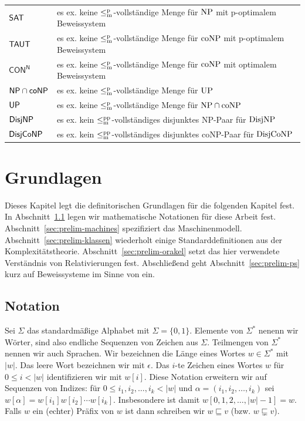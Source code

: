 \bigskip
\begin{tabular}{l@{\quad:\quad}l}
    $\mathsf{SAT}$ & es ex. keine $\leq_\mathrm{m}^\mathrm{p}$-vollständige Menge für $\mathrm{NP}$ mit p-optimalem Beweissystem\\
    $\mathsf{TAUT}$ & es ex. keine $\leq_\mathrm{m}^\mathrm{p}$-vollständige Menge für $\mathrm{coNP}$ mit p-optimalem Beweissystem\\
    $\mathsf{CON^N}$ & es ex. keine $\leq_\mathrm{m}^\mathrm{p}$-vollständige Menge für $\mathrm{coNP}$ mit optimalem Beweissystem\\
    $\mathsf{NP}{}\cap{}\mathsf{coNP}$ & es ex. keine $\leq_\mathrm{m}^\mathrm{p}$-vollständige Menge für $\mathrm{UP}$\\
    $\mathsf{UP}$ & es ex. keine $\leq_\mathrm{m}^\mathrm{p}$-vollständige Menge für $\mathrm{NP}\cap\mathrm{coNP}$\\
    $\mathsf{DisjNP}$ & es ex. kein $\leq_\mathrm{m}^\mathrm{pp}$-vollständiges disjunktes NP-Paar für $\mathrm{DisjNP}$\\
    $\mathsf{DisjCoNP}$ & es ex. kein $\leq_\mathrm{m}^\mathrm{pp}$-vollständiges disjunktes coNP-Paar für $\mathrm{DisjCoNP}$
\end{tabular}
\bigskip

\chapter{Grundlagen}

Dieses Kapitel legt die definitorischen Grundlagen für die folgenden Kapitel fest. In Abschnitt~\ref{sec:notation} legen wir mathematische Notationen für diese Arbeit fest. Abschnitt~\ref{sec:prelim-machines} spezifiziert das Maschinenmodell.  Abschnitt~\ref{sec:prelim-klassen} wiederholt einige Standarddefinitionen aus der Komplexitätstheorie. Abschnitt~\ref{sec:prelim-orakel} setzt das hier verwendete Verständnis von Relativierungen fest. Abschließend geht Abschnitt~\ref{sec:prelim-ps} kurz auf Beweissysteme im Sinne von \textcite{cook_relative_1979} ein.

\section{Notation}\label{sec:notation}

Sei $\Sigma$ das standardmäßige Alphabet mit $\Sigma=\{0,1\}$. Elemente von $\Sigma^*$ nenenn wir Wörter, sind also endliche Sequenzen von Zeichen aus $\Sigma$. Teilmengen von $\Sigma^*$ nennen wir auch Sprachen. Wir bezeichnen die Länge eines Wortes $w\in\Sigma^*$ mit $|w|$. Das leere Wort bezeichnen wir mit $\epsilon$. Das $i$-te Zeichen eines Wortes $w$ für $0\leq i< |w|$ identifizieren wir mit $w[i]$. Diese Notation erweitern wir auf Sequenzen von Indizes: für $0\leq i_1, i_2, \dots, i_k< |w|$ und $\alpha=(i_1, i_2, \dots, i_k)$ sei $w[\alpha] = w[i_1]w[i_2]\cdots w[i_k]$. Insbesondere ist damit $w[0,1,2,\dots, |w|-1]= w$.
Falls $w$ ein (echter) Präfix von $w$ ist dann schreiben wir $w \sqsubseteq v$ (bzw. $w\sqsubsetneq v$).

